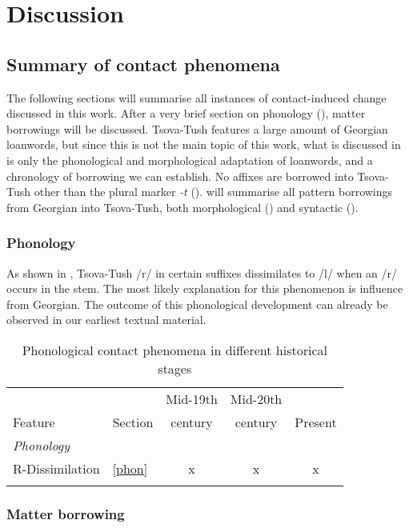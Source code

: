 \chapter{Discussion} \label{conclusion}

\section{Summary of contact phenomena} \label{summaries}

The following sections will summarise all instances of contact-induced change discussed in this work. After a very brief section on phonology (), matter borrowings will be discussed. Tsova-Tush features a large amount of Georgian loanwords, but since this is not the main topic of this work, what is discussed in  is only the phonological and morphological adaptation of loanwords, and a chronology of borrowing we can establish. No affixes are borrowed into Tsova-Tush other than the plural marker \textit{-t} ().  will summarise all pattern borrowings from Georgian into Tsova-Tush, both morphological () and syntactic ().

\subsection{Phonology} \label{summphon}
As shown in , Tsova-Tush /r/ in certain suffixes dissimilates to /l/ when an /r/ occurs in the stem. The most likely explanation for this phenomenon is influence from Georgian. The outcome of this phonological development can already be observed in our earliest textual material.

\begin{table}
	\begin{tabular}{llccc}
    \lsptoprule
		&  & Mid-19th & Mid-20th &  \\
		Feature & Section & century & century & Present  \\
		\midrule
		\emph{Phonology}&  & & & \\
		R-Dissimilation & \ref{phon} & x & x & x \\
		\lspbottomrule
	\end{tabular}
	\caption{Phonological contact phenomena in different historical stages}
	\label{concl-table1}
\end{table}		

\subsection{Matter borrowing}
